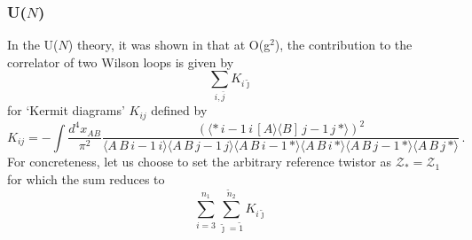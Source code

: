 \documentclass[12pt]{article}
\numberwithin{equation}{section}
\begin{document}
\subsubsection{U(\texorpdfstring{$N$}{N})}
In the U($N$) theory, it was shown in \cite{Drummond:2025ulh} that at O(g$^2$), the contribution to the correlator of two Wilson loops is given by 
\begin{equation}
    \sum_{i,\bar{j}}K_{i \tilde{\jmath}}
\end{equation}
for `Kermit diagrams' $K_{ij}$ defined by
\begin{equation}
K_{ij} = -\int \frac{d^4 x_{AB}}{\pi^2} \frac{(\langle *\, i-1\, i \,[A\rangle \langle B] \,j-1 \, j\, * \rangle)^2}{\langle A\,B\, i-1\, i\rangle \langle A\,B\, j-1\, j\rangle \langle A\, B\, i-1 \,* \rangle \langle A\, B\, i \,* \rangle \langle A\, B\, j-1 \,* \rangle \langle A\, B\, j \,* \rangle}\,.
\end{equation}
For concreteness, let us choose to set the arbitrary reference twistor as \(\mathcal{Z}_* = \mathcal{Z}_1\) for which the sum reduces to 
\begin{equation}
\sum_{i=3}^{n_1}\sum_{\tilde{\jmath}=\tilde{1}}^{\tilde{n}_2} K_{i\tilde{\jmath}}
\end{equation}
\end{document}
